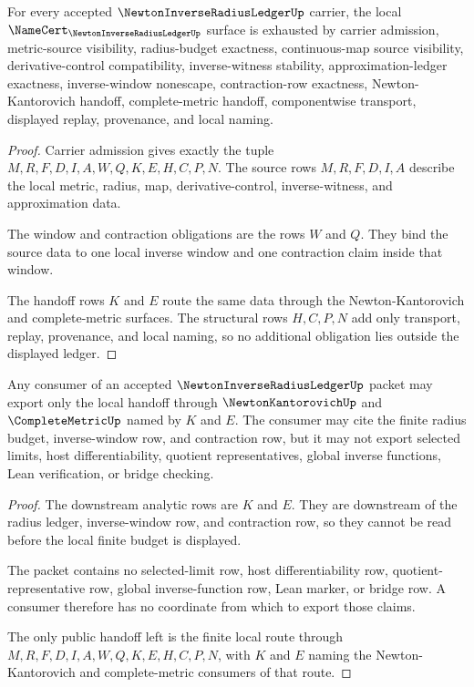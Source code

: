 \begin{theorem}
\label{thm:newton-inverse-radius-ledger-namecert-ledger}
For every accepted $\NewtonInverseRadiusLedgerUp$ carrier, the local $\NameCert_{\NewtonInverseRadiusLedgerUp}$ surface is exhausted by carrier admission, metric-source visibility, radius-budget exactness, continuous-map source visibility, derivative-control compatibility, inverse-witness stability, approximation-ledger exactness, inverse-window nonescape, contraction-row exactness, Newton-Kantorovich handoff, complete-metric handoff, componentwise transport, displayed replay, provenance, and local naming.
\end{theorem}
\begin{proof}
Carrier admission gives exactly the tuple $M,R,F,D,I,A,W,Q,K,E,H,C,P,N$. The source rows $M,R,F,D,I,A$ describe the local metric, radius, map, derivative-control, inverse-witness, and approximation data.

The window and contraction obligations are the rows $W$ and $Q$. They bind the source data to one local inverse window and one contraction claim inside that window.

The handoff rows $K$ and $E$ route the same data through the Newton-Kantorovich and complete-metric surfaces. The structural rows $H,C,P,N$ add only transport, replay, provenance, and local naming, so no additional obligation lies outside the displayed ledger.
\end{proof}

\begin{theorem}
\label{thm:newton-inverse-radius-ledger-local-handoff}
Any consumer of an accepted $\NewtonInverseRadiusLedgerUp$ packet may export only the local handoff through $\NewtonKantorovichUp$ and $\CompleteMetricUp$ named by $K$ and $E$. The consumer may cite the finite radius budget, inverse-window row, and contraction row, but it may not export selected limits, host differentiability, quotient representatives, global inverse functions, Lean verification, or bridge checking.
\end{theorem}
\begin{proof}
The downstream analytic rows are $K$ and $E$. They are downstream of the radius ledger, inverse-window row, and contraction row, so they cannot be read before the local finite budget is displayed.

The packet contains no selected-limit row, host differentiability row, quotient-representative row, global inverse-function row, Lean marker, or bridge row. A consumer therefore has no coordinate from which to export those claims.

The only public handoff left is the finite local route through $M,R,F,D,I,A,W,Q,K,E,H,C,P,N$, with $K$ and $E$ naming the Newton-Kantorovich and complete-metric consumers of that route.
\end{proof}

